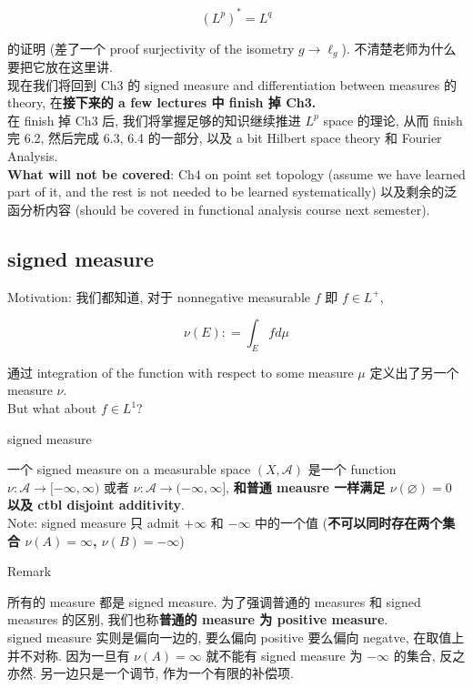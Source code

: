 \documentclass{qlnotes-export}
\begin{document}
\[(L^{p})^{\ast} = L^{q}\]

的证明 (差了一个 proof surjectivity of the isometry \(g\rightarrow\ell_{g}\)). 不清楚老师为什么要把它放在这里讲.\\
现在我们将回到 Ch3 的 signed measure and differentiation between measures 的 theory, 在\textbf{接下来的 a few lectures 中 finish 掉 Ch3.}\\
在 finish 掉 Ch3 后, 我们将掌握足够的知识继续推进 \(L^{p}\) space 的理论, 从而 finish 完 6.2, 然后完成 6.3, 6.4 的一部分, 以及 a bit Hilbert space theory 和 Fourier Analysis.\\
\textbf{What will not be covered}: Ch4 on point set topology (assume we have learned part of it, and the rest is not needed to be learned systematically) 以及剩余的泛函分析内容 (should be covered in functional analysis course next semester).

\subsection{signed measure}\label{signed-measure}

Motivation: 我们都知道, 对于 nonnegative measurable \(f\) 即 \(f \in L^{+}\),

\[\nu(E): = \int_{E}f d\mu\]

通过 integration of the function with respect to some measure \(\mu\) 定义出了另一个 measure \(\nu\).\\
But what about \(f \in L^{1}\)?

\begin{definition}{signed measure}\label{def-10-signed-measure-jordan-decomposition-signed-measure}

一个 signed measure on a measurable space \((X,\mathcal{A})\) 是一个 function \(\nu:\mathcal{A}\rightarrow\lbrack - \infty,\infty)\) 或者 \(\nu:\mathcal{A}\rightarrow( - \infty,\infty\rbrack\), \textbf{和普通 meausre 一样满足 \(\nu(\varnothing) = 0\) 以及 ctbl disjoint additivity}.\\
Note: signed measure 只 admit \(+ \infty\) 和 \(- \infty\) 中的一个值 (\textbf{不可以同时存在两个集合 \(\nu(A) = \infty\), \(\nu(B) = - \infty\)})

\end{definition}

\begin{qlremark}{Remark}

所有的 measure 都是 signed measure. 为了强调普通的 measures 和 signed measures 的区别, 我们也称\textbf{普通的 measure 为 positive measure}.\\
signed measure 实则是偏向一边的, 要么偏向 positive 要么偏向 negatve, 在取值上并不对称. 因为一旦有 \(\nu(A) = \infty\) 就不能有 signed measure 为 \(- \infty\) 的集合, 反之亦然. 另一边只是一个调节, 作为一个有限的补偿项.

\end{qlremark}
\end{document}
